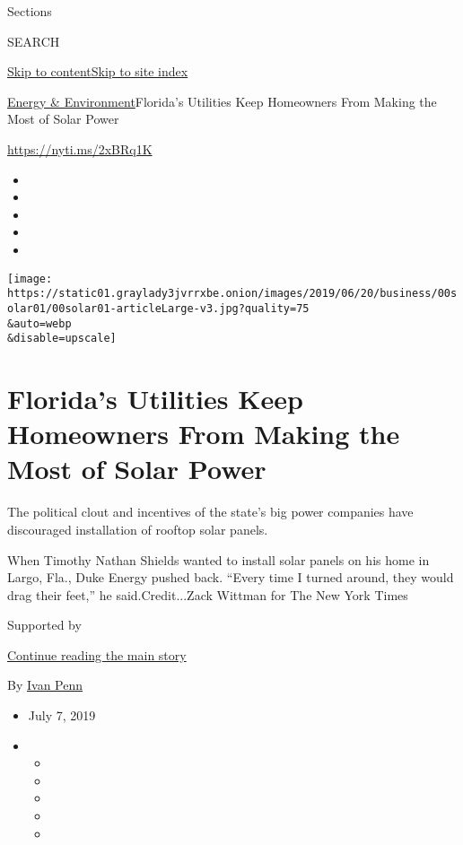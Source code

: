 Sections

SEARCH

\protect\hyperlink{site-content}{Skip to
content}\protect\hyperlink{site-index}{Skip to site index}

\href{/section/business/energy-environment}{Energy \&
Environment}\textbar{}Florida's Utilities Keep Homeowners From Making
the Most of Solar Power

\url{https://nyti.ms/2xBRq1K}

\begin{itemize}
\item
\item
\item
\item
\item
\end{itemize}

\texttt{[image: https://static01.graylady3jvrrxbe.onion/images/2019/06/20/business/00solar01/00solar01-articleLarge-v3.jpg?quality=75\\\&auto=webp\\\&disable=upscale]}

\hypertarget{floridas-utilities-keep-homeowners-from-making-the-most-of-solar-power}{%
\section{Florida's Utilities Keep Homeowners From Making the Most of
Solar
Power}\label{floridas-utilities-keep-homeowners-from-making-the-most-of-solar-power}}

The political clout and incentives of the state's big power companies
have discouraged installation of rooftop solar panels.

When Timothy Nathan Shields wanted to install solar panels on his home
in Largo, Fla., Duke Energy pushed back. ``Every time I turned around,
they would drag their feet,'' he said.Credit...Zack Wittman for The New
York Times

Supported by

\protect\hyperlink{after-sponsor}{Continue reading the main story}

By \href{https://www.nytimes3xbfgragh.onion/by/ivan-penn}{Ivan Penn}

\begin{itemize}
\item
  July 7, 2019
\item
  \begin{itemize}
  \item
  \item
  \item
  \item
  \item
  \end{itemize}
\end{itemize}

